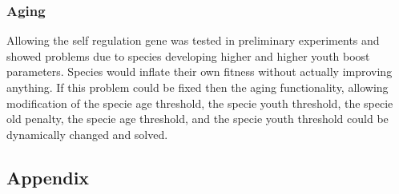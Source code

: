 \documentclass[12pt]{ucthesis} \newif\ifpdf \ifx\pdfoutput\undefined
\begin{document}
\subsection{Aging}

Allowing the self regulation gene was tested in preliminary experiments and
showed problems due to species developing higher and higher youth boost
parameters. Species would inflate their own fitness without actually improving
anything. If this problem could be fixed then the aging functionality, allowing
modification of the specie age threshold, the specie youth threshold, the specie
old penalty, the specie age threshold, and the specie youth threshold could be
dynamically changed and solved.


\clearpage



\begin{landscape} 
\chapter{Appendix}


\end{landscape}
\end{document}

